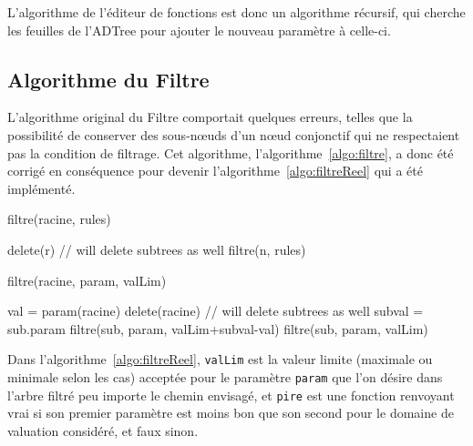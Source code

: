     L'algorithme de l'éditeur de fonctions est donc un algorithme récursif, qui cherche les feuilles de l'ADTree pour ajouter le nouveau paramètre à celle-ci. 

\subsection{Algorithme du Filtre}
\label{ssec:implemFiltre}

L'algorithme original du Filtre comportait quelques erreurs, telles que la possibilité de conserver des sous-n\oe{}uds d'un n\oe{}ud conjonctif qui ne respectaient pas la condition de filtrage. Cet algorithme, l'{\sc algorithme}~\ref{algo:filtre}, a donc été corrigé en conséquence pour devenir l'{\sc algorithme}~\ref{algo:filtreReel} qui a été implémenté.

 	\begin{algorithm}[H]
            \caption{filtre(racine, rules)}
            \label{algo:filtre}
            \begin{algorithmic}
                        \STATE delete(r) // will delete subtrees as well
                        \RETURN
                    \ENDIF
                \ENDFOR
                \STATE
                    \STATE filtre(n, rules)
                \ENDFOR
            \end{algorithmic}
        \end{algorithm}
        

 	\begin{algorithm}[H]
            \caption{filtre(racine, param, valLim)}
            \label{algo:filtreReel}
            \begin{algorithmic}
	\STATE val = param(racine)
	\STATE
		\STATE delete(racine) // will delete subtrees as well
		\RETURN
	\STATE
	\ELSE
				\STATE subval = sub.param
				\STATE filtre(sub, param, valLim+subval-val)
			\ENDFOR
		\ELSE
				\STATE filtre(sub, param, valLim)
			\ENDFOR
		\ENDIF
	\ENDIF
            \end{algorithmic}
        \end{algorithm}

    Dans l'{\sc algorithme}~\ref{algo:filtreReel}, \verb|valLim| est la valeur limite (maximale ou minimale selon les cas) acceptée pour le paramètre \verb|param| que l'on désire dans l'arbre filtré peu importe le chemin envisagé, et  \verb|pire| est une fonction renvoyant vrai si son premier paramètre est moins bon que son second pour le domaine de valuation considéré, et faux sinon.

